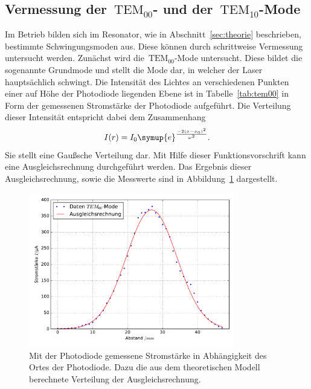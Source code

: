 \subsection{Vermessung der~$\text{TEM}_{00}$- und der~$\text{TEM}_{10}$-Mode}
%
Im Betrieb bilden sich im Resonator, wie in Abschnitt~\ref{sec:theorie} beschrieben, bestimmte Schwingungsmoden aus. Diese können durch
schrittweise Vermessung untersucht werden. Zunächst wird die~$\text{TEM}_{00}$-Mode untersucht. Diese bildet die sogenannte Grundmode und stellt die
Mode dar, in welcher der Laser hauptsächlich schwingt. Die Intensität des Lichtes an verschiedenen Punkten einer auf Höhe der Photodiode liegenden
Ebene ist in Tabelle~\ref{tab:tem00} in Form der gemessenen Stromstärke der Photodiode aufgeführt. Die Verteilung dieser Intensität entspricht dabei
dem Zusammenhang
%
\begin{equation}
  I(r)=I_0\symup{e}^{\frac{-2(x-x_0)^2}{\omega^2}}.
\end{equation}
%
Sie stellt eine Gaußsche Verteilung dar. Mit Hilfe dieser Funktionsvorschrift kann eine Ausgleichsrechnung durchgeführt werden. Das Ergebnis dieser Ausgleichsrechnung, sowie die Messwerte sind in Abbildung~\ref{fig:tem00} dargestellt.
%
\begin{figure}[h]
  \centering
  \includegraphics[width=0.8\textwidth]{auswertung/plot_Mode00.pdf}
  \caption{Mit der Photodiode gemessene Stromstärke in Abhängigkeit des Ortes der Photodiode. Dazu die aus dem theoretischen Modell berechnete Verteilung der Ausgleichsrechnung.}
  \label{fig:tem00}
\end{figure}
%
